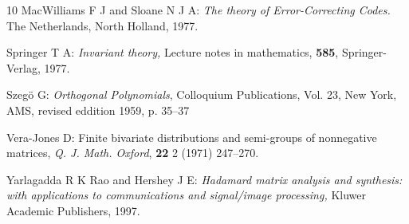 \documentclass[12pt]{article}    %
\begin{document}
\begin{thebibliography}{10}
MacWilliams F J and Sloane N J A: 
\emph{The theory of Error-Correcting Codes.}
The Netherlands, North Holland, 1977.

Springer T A:
\emph{Invariant theory,}
Lecture notes in mathematics, {\bf 585},
Springer-Verlag, 1977.


Szeg\"o G:
{\sl Orthogonal Polynomials}, 
Colloquium Publications, Vol. 23, New York, AMS, revised eddition 1959, p.
35--37


Vera-Jones D:
Finite bivariate distributions and semi-groups of nonnegative matrices,
\emph{Q. J. Math. Oxford}, {\bf 22} 2 (1971)
247--270.


 Yarlagadda R K Rao and Hershey J E:
\emph{Hadamard matrix analysis and synthesis: with applications
to communications and signal/image processing,}
Kluwer Academic Publishers, 1997.

\end{thebibliography}
\end{document}
